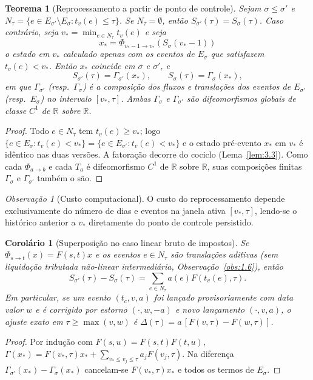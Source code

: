 \documentclass[11pt, a4paper]{article}
\theoremstyle{definition}
\theoremstyle{plain}
\newtheorem{teorema}[definicao]{Teorema}
\newtheorem{corolario}[definicao]{Corolário}
\theoremstyle{remark}
\newtheorem{observacao}[definicao]{Observação}
\begin{document}
\begin{teorema}[Reprocessamento a partir de ponto de controle]\label{teo:4.3}
Sejam $\sigma \le \sigma'$ e $N_\tau = \{e \in E_{\sigma'} \setminus E_\sigma : t_v(e) \le \tau\}$. Se $N_\tau = \emptyset$, então $S_{\sigma'}(\tau) = S_\sigma(\tau)$. Caso contrário, seja $v_* = \min_{e \in N_\tau} t_v(e)$ e seja
\[
x_* = \Phi_{v_* - 1 \to v_*}(S_\sigma(v_* - 1))
\]
o estado em $v_*$ calculado apenas com os eventos de $E_\sigma$ que satisfazem $t_v(e) < v_*$. Então $x_*$ coincide em $\sigma$ e $\sigma'$, e
\[
S_{\sigma'}(\tau) = \Gamma_{\sigma'}(x_*), \qquad S_\sigma(\tau) = \Gamma_\sigma(x_*),
\]
em que $\Gamma_{\sigma'}$ (resp.\ $\Gamma_\sigma$) é a composição dos fluxos e translações dos eventos de $E_{\sigma'}$ (resp.\ $E_\sigma$) no intervalo $[v_*, \tau]$. Ambas $\Gamma_\sigma$ e $\Gamma_{\sigma'}$ são difeomorfismos globais de classe $C^1$ de $\mathbb{R}$ sobre $\mathbb{R}$.
\end{teorema}
\begin{proof}
Todo $e \in N_\tau$ tem $t_v(e) \ge v_*$; logo $\{e \in E_\sigma : t_v(e) < v_*\} = \{e \in E_{\sigma'} : t_v(e) < v_*\}$ e o estado pré-evento $x_*$ em $v_*$ é idêntico nas duas versões. A fatoração decorre do cociclo (Lema~\ref{lem:3.3}). Como cada $\Phi_{a \to b}$ e cada $T_a$ é difeomorfismo $C^1$ de $\mathbb{R}$ sobre $\mathbb{R}$, suas composições finitas $\Gamma_\sigma$ e $\Gamma_{\sigma'}$ também o são.
\end{proof}

\begin{observacao}[Custo computacional]\label{obs:4.4}
O custo do reprocessamento depende exclusivamente do número de dias e eventos na janela ativa $[v_*, \tau]$, lendo-se o histórico anterior a $v_*$ diretamente do ponto de controle persistido.
\end{observacao}

\begin{corolario}[Superposição no caso linear bruto de impostos]\label{cor:4.5}
Se $\Phi_{s \to t}(x) = F(s,t)x$ e os eventos $e \in N_\tau$ são translações aditivas (sem liquidação tributada não-linear intermediária, Observação~\ref{obs:1.6}), então
\[
S_{\sigma'}(\tau) - S_\sigma(\tau) = \sum_{e \in N_\tau} a(e) F(t_v(e), \tau).
\]
Em particular, se um evento $(t_c, v, a)$ foi lançado provisoriamente com data valor $w$ e é corrigido por estorno $(\cdot, w, -a)$ e novo lançamento $(\cdot, v, a)$, o ajuste exato em $\tau \ge \max(v, w)$ é $\Delta(\tau) = a\,[F(v, \tau) - F(w, \tau)]$.
\end{corolario}
\begin{proof}
Por indução com $F(s,u) = F(s,t)F(t,u)$, $\Gamma(x_*) = F(v_*, \tau)x_* + \sum_{v_* \le v_j \le \tau} a_j F(v_j, \tau)$. Na diferença $\Gamma_{\sigma'}(x_*) - \Gamma_\sigma(x_*)$ cancelam-se $F(v_*, \tau)x_*$ e todos os termos de $E_\sigma$.
\end{proof}
\end{document}
